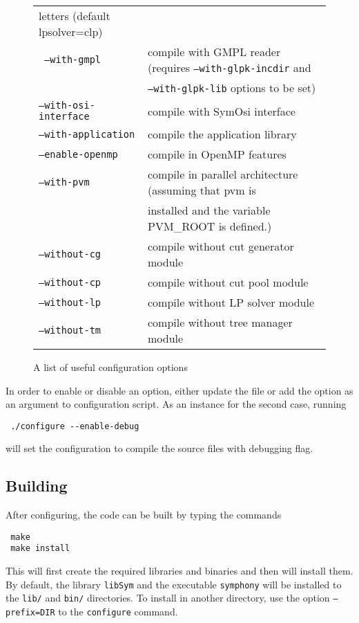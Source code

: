 \begin{figure}[htb]
\begin{tabular}{ll}
letters (default lpsolver=clp) \\
\texttt{ --with-gmpl} &  compile with GMPL reader (requires 
\texttt{--with-glpk-incdir} and \\ &
\texttt{--with-glpk-lib} options to be set) \\
\texttt{--with-osi-interface} &  compile with SymOsi interface \\
\texttt{--with-application} &  compile the application library \\
\hline
\texttt{--enable-openmp} &   compile in OpenMP features \\
\texttt{--with-pvm } &  compile in parallel architecture (assuming that pvm is \\ 
&installed and the variable PVM\_ROOT is defined.) \\
\texttt{--without-cg} &  compile without cut generator module \\
\texttt{--without-cp} &  compile without cut pool module \\
\texttt{--without-lp} &  compile without LP solver module \\
\texttt{--without-tm} &  compile without tree manager module
\end{tabular}
\caption{A list of useful configuration options \label{conf_opts}}
\end{figure}

In order to enable or disable an option, either update the file 
 or add the option as an argument to configuration script. 
As an instance for the second case, running 
{\color{Brown}
\begin{verbatim}
 ./configure --enable-debug
\end{verbatim}
}
will set the configuration to compile the source files with debugging
flag. 

\subsection{Building}\label{building}

After configuring, the code can be built by typing the commands
{\color{Brown}
\begin{verbatim}
 make
 make install
\end{verbatim}
} This will first create the required libraries and binaries and then will
install them. By default, the library {\color{Brown}\texttt{libSym}} and the
executable {\color{Brown}\texttt{symphony}} will be installed to the
{\color{Brown}\texttt{lib/}} and {\color{Brown}\texttt{bin/}} directories. To
install in another directory, use the option
{\color{Brown}\texttt{--prefix=DIR}} to the {\color{Brown}\texttt{configure}}
command.

